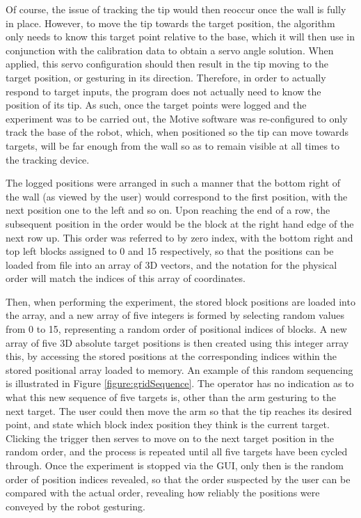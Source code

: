 \documentclass[11pt]{article}
\begin{document}
Of course, the issue of tracking the tip would then reoccur once the wall is fully in place. However, to move the tip towards the target position, the algorithm only needs to know this target point relative to the base, which it will then use in conjunction with the calibration data to obtain a servo angle solution. When applied, this servo configuration should then result in the tip moving to the target position, or gesturing in its direction. Therefore, in order to actually respond to target inputs, the program does not actually need to know the position of its tip. As such, once the target points were logged and the experiment was to be carried out, the Motive software was re-configured to only track the base of the robot, which, when positioned so the tip can move towards targets, will be far enough from the wall so as to remain visible at all times to the tracking device. 

The logged positions were arranged in such a manner that the bottom right of the wall (as viewed by the user) would correspond to the first position, with the next position one to the left and so on. Upon reaching the end of a row, the subsequent position in the order would be the block at the right hand edge of the next row up. This order was referred to by zero index, with the bottom right and top left blocks assigned to 0 and 15 respectively, so that the positions can be loaded from file into an array of 3D vectors, and the notation for the physical order will match the indices of this array of coordinates. 

Then, when performing the experiment, the stored block positions are loaded into the array, and a new array of five integers is formed by selecting random values from 0 to 15, representing a random order of positional indices of blocks. A new array of five 3D absolute target positions is then created using this integer array this, by accessing the stored positions at the corresponding indices within the stored positional array loaded to memory. An example of this random sequencing is illustrated in Figure \ref{figure:gridSequence}. The operator has no indication as to what this new sequence of five targets is, other than the arm gesturing to the next target. The user could then move the arm so that the tip reaches its desired point, and state which block index position they think is the current target. Clicking the trigger then serves to move on to the next target position in the random order, and the process is repeated until all five targets have been cycled through. Once the experiment is stopped via the GUI, only then is the random order of position indices revealed, so that the order suspected by the user can be compared with the actual order, revealing how reliably the positions were conveyed by the robot gesturing.
\end{document}
